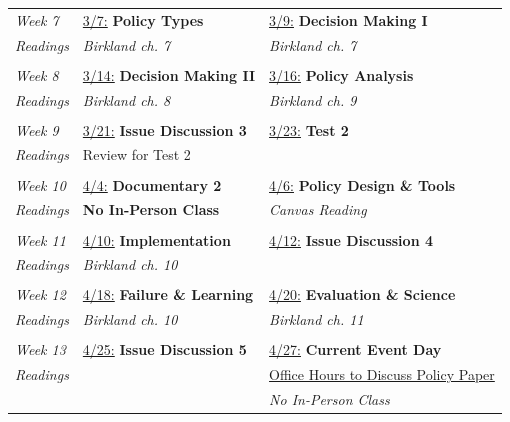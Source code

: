 \documentclass[11pt]{article}
\begin{document}
\begin{center}
\begin{longtable}{p{1.5cm} | p{7.8cm} | p{7.5cm}}
	\emph{Week 7}	& \underline{3/7:} \textbf{Policy Types}				& \underline{3/9:} \textbf{Decision Making I}		\\
	\emph{Readings}	& \textit{Birkland ch. 7}								& \textit{Birkland ch. 7}						 	\\
					& 														& 													\\ \hline	
	
	\emph{Week 8}	& \underline{3/14:} \textbf{Decision Making II} 		& \underline{3/16:} \textbf{Policy Analysis}			\\
	\emph{Readings}	& \textit{Birkland ch. 8}								& \textit{Birkland ch. 9}							\\
					& 														& 													\\ \hline	
	
	\emph{Week 9}	& \underline{3/21:} \textbf{Issue Discussion 3}			& \underline{3/23:} \textbf\textbf{Test 2}				\\
	\emph{Readings}	& Review for Test 2										& 	  													\\
					& 														& 													\\ \hline	
	
	\emph{Week 10} 	& \underline{4/4:} \textbf{Documentary 2}				& \underline{4/6:} \textbf{Policy Design \& Tools} 			\\
	\emph{Readings}	& \textbf{No In-Person Class}							& \textit{Canvas Reading}							\\ 
					&														&													\\\hline	
	
	\emph{Week 11}  & \underline{4/10:} \textbf{Implementation} 			& \underline{4/12:} \textbf{Issue Discussion 4} 			\\
	\emph{Readings}	& \textit{Birkland ch. 10}								& 													\\
					& 														& 													\\ \hline	
	
	\emph{Week 12} 	& \underline{4/18:} \textbf{Failure \& Learning}	 	& \underline{4/20:} \textbf{Evaluation \& Science}		\\
	\emph{Readings}	& \textit{Birkland ch. 10}								& \textit{Birkland ch. 11}							\\
					&														& 													\\\hline	
		
	\emph{Week 13} 	& \underline{4/25:} \textbf{Issue Discussion 5}			& \underline{4/27:} \textbf{Current Event Day}		\\
	\emph{Readings}	& 														& \href{https://t.ly/4dpa}{Office Hours to Discuss Policy Paper}		\\
					& 														& \textit{No In-Person Class}						\\ \hline	
	

\end{longtable}
\end{center}
\end{document}
